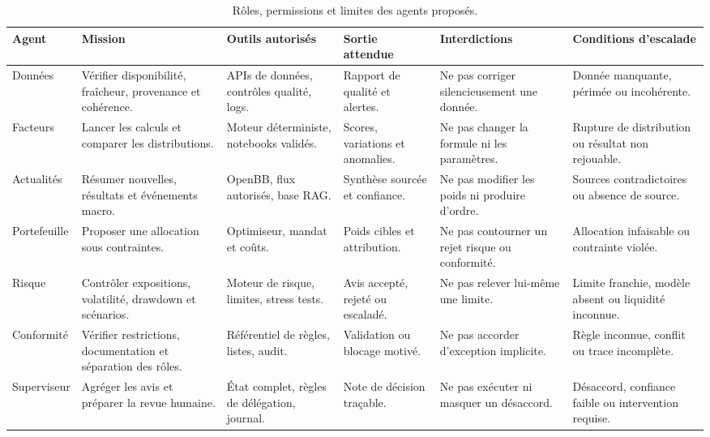 \begin{table}[H]
\centering
\caption{Rôles, permissions et limites des agents proposés.}
\label{tab:agents-proposes}
\scriptsize
\begin{adjustbox}{width=\textwidth}
\begin{tabular}{p{}p{}p{}p{}p{}p{}}
\toprule
\textbf{Agent} & \textbf{Mission} & \textbf{Outils autorisés} & \textbf{Sortie attendue} & \textbf{Interdictions} & \textbf{Conditions d'escalade} \\
\midrule
Données & Vérifier disponibilité, fraîcheur, provenance et cohérence. & APIs de données, contrôles qualité, logs. & Rapport de qualité et alertes. & Ne pas corriger silencieusement une donnée. & Donnée manquante, périmée ou incohérente. \\
Facteurs & Lancer les calculs et comparer les distributions. & Moteur déterministe, notebooks validés. & Scores, variations et anomalies. & Ne pas changer la formule ni les paramètres. & Rupture de distribution ou résultat non rejouable. \\
Actualités & Résumer nouvelles, résultats et événements macro. & OpenBB, flux autorisés, base RAG. & Synthèse sourcée et confiance. & Ne pas modifier les poids ni produire d'ordre. & Sources contradictoires ou absence de source. \\
Portefeuille & Proposer une allocation sous contraintes. & Optimiseur, mandat et coûts. & Poids cibles et attribution. & Ne pas contourner un rejet risque ou conformité. & Allocation infaisable ou contrainte violée. \\
Risque & Contrôler expositions, volatilité, drawdown et scénarios. & Moteur de risque, limites, stress tests. & Avis accepté, rejeté ou escaladé. & Ne pas relever lui-même une limite. & Limite franchie, modèle absent ou liquidité inconnue. \\
Conformité & Vérifier restrictions, documentation et séparation des rôles. & Référentiel de règles, listes, audit. & Validation ou blocage motivé. & Ne pas accorder d'exception implicite. & Règle inconnue, conflit ou trace incomplète. \\
Superviseur & Agréger les avis et préparer la revue humaine. & État complet, règles de délégation, journal. & Note de décision traçable. & Ne pas exécuter ni masquer un désaccord. & Désaccord, confiance faible ou intervention requise. \\
\bottomrule
\end{tabular}
\end{adjustbox}
\end{table}

